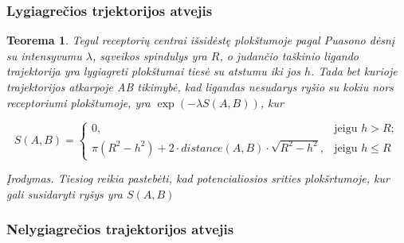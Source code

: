 \documentclass[10pt]{article}
\newtheorem{thm}{Teorema}
\begin{document}
\subsubsection{Lygiagrečios trjektorijos atvejis}

\begin{thm}\label{thm:2}
Tegul receptorių centrai išsidėstę plokštumoje  pagal Puasono dėsnį su intensyvumu $\lambda$,  sąveikos spindulys yra $R$, o judančio taškinio ligando trajektorija yra lygiagreti plokštumai tiesė su atstumu iki jos  $ h $. Tada bet kurioje trajektorijos atkarpoje AB tikimybė, kad ligandas nesudarys ryšio su kokiu nors receptoriumi plokštumoje, yra $ \exp( -\lambda S(A,B)) $, kur 

\[
S(A,B) =
\begin{cases}
0, & \text{jeigu } h>R; \\

\pi(R^2-h^2) + 2 \cdot distance(A,B) \cdot \sqrt{R^2-h^2}, & 
 \text{jeigu }  h \leqslant R

\end{cases}
\]

Įrodymas. Tiesiog reikia pastebėti, kad potencialiosios srities plokšrtumoje, kur gali susidaryti ryšys yra $ S(A,B) $

\end{thm}

\subsubsection{Nelygiagrečios trajektorijos atvejis}
\end{document}
